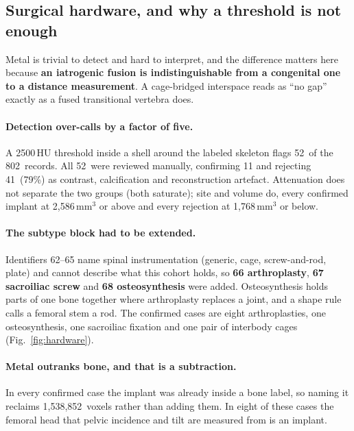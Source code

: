 \documentclass[aapm,mph,amsmath,amssymb,reprint]{revtex4-2}
\begin{document}
\subsection{Surgical hardware, and why a threshold is not enough}
\label{sec:hardware}

Metal is trivial to detect and hard to interpret, and the difference matters here because
\textbf{an iatrogenic fusion is indistinguishable from a congenital one to a distance measurement}. A cage-bridged interspace reads as ``no gap'' exactly as a fused transitional
vertebra does.

\paragraph{Detection over-calls by a factor of five.} A 2500\,HU threshold inside a shell
around the labeled skeleton flags 52\ of the 802\ records. All 52\ were reviewed
manually, confirming 11 and rejecting 41\ (79\%) as contrast, calcification and
reconstruction artefact. Attenuation does not separate the two groups
(both saturate); site and volume do, every confirmed implant at 2,586\,mm$^3$ or above and
every rejection at 1,768\,mm$^3$ or below.

\paragraph{The subtype block had to be extended.} Identifiers 62--65 name spinal instrumentation (generic, cage, screw-and-rod, plate) and cannot describe what this cohort holds, so \textbf{66 arthroplasty}, \textbf{67 sacroiliac screw} and \textbf{68 osteosynthesis} were added. Osteosynthesis holds parts of one bone together where
arthroplasty replaces a joint, and a shape rule calls a femoral stem a rod. The confirmed
cases are eight arthroplasties, one osteosynthesis, one sacroiliac fixation and one pair of
interbody cages (Fig.~\ref{fig:hardware}).

\paragraph{Metal outranks bone, and that is a subtraction.} In every confirmed case the
implant was already inside a bone label, so naming it reclaims 1,538,852\ voxels rather
than adding them. In eight of these cases the femoral head that pelvic incidence and tilt are
measured from is an implant.
\end{document}
